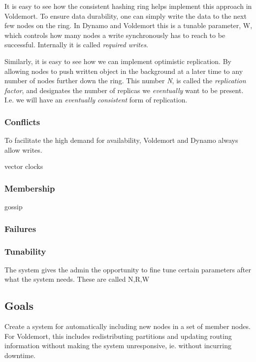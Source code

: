 It is easy to see how the consistent hashing ring helps implement this approach in Voldemort.
To ensure data durability, one can simply write the data to the next few nodes on the ring. In Dynamo and Voldemort this is a tunable parameter, W, which controls how many nodes a write synchronously has to reach to be successful. 
Internally it is called \emph{required writes}.

Similarly, it is easy to see how we can implement optimistic replication.
By allowing nodes to push written object in the background at a later time to any number of nodes further down the ring.
This number \emph{N}, is called the \emph{replication factor}, and designates the number of replicas we \emph{eventually} want to be present.
I.e. we will have an \emph{eventually consistent} form of replication.


\subsubsection{Conflicts}
To facilitate the high demand for availability, Voldemort and Dynamo always allow writes.

vector clocks

\subsubsection{Membership}
gossip

\subsubsection{Failures}

\subsubsection{Tunability}
The system gives the admin the opportunity to fine tune certain parameters after what the system needs.
These are called N,R,W

\subsection{Goals}
Create a system for automatically including new nodes in a set of member nodes.
For Voldemort, this includes redistributing partitions and updating routing information without making the system unresponsive, ie. without incurring downtime.


